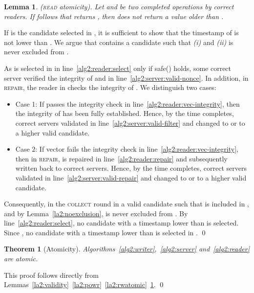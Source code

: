 \documentclass[10pt,conference,compsocconf]{IEEEtran}
\newtheorem{la}[defn]{Lemma}
\newtheorem{theo}[defn]{Theorem}
\newenvironment{prooff}{\vspace{1ex}\noindent{\bf Proof:}\hspace{0.5em}}
	{\hfill\qed\vspace{1em}}
\begin{document}
\begin{la}
\label{la2:rratomic}
\emph{(\textsc{read} atomicity).}
Let  and  be two completed  operations by correct readers. If  follows  that returns , then  does not return a value older than .
\end{la}
\begin{prooff} If  is the candidate selected in , it is sufficient to show that the timestamp of  is not lower than . We argue that
 contains a candidate  such that \textit{(i)}  and \textit{(ii)}  is never excluded from .

As  is selected in  in line~\ref{alg2:reader:select} only if \textsf{safe}() holds, some correct server verified the integrity of  and  in line~\ref{alg2:server:valid-nonce}. In addition, in \textsc{repair}, the reader in  checks the integrity of . We distinguish two cases:
\begin{itemize}
\item Case 1: If  passes the integrity check in line~\ref{alg2:reader:vec-integrity}, then the integrity of  has been fully established. Hence, by the time  completes,  correct servers validated  in line~\ref{alg2:server:valid-filter} and changed  to  or to a higher valid candidate.
\item Case 2: If vector  fails the integrity check in line~\ref{alg2:reader:vec-integrity}, then in \textsc{repair},  is repaired in line~\ref{alg2:reader:repair} and subsequently written back to  correct servers. Hence, by the time  completes,  correct servers validated  in line~\ref{alg2:server:valid-repair} and changed  to  or to a higher valid candidate.
\end{itemize}
Consequently, in the \textsc{collect} round in  a valid candidate  such that  is included in , and by Lemma~\ref{la2:noexclusion},  is never excluded from . By line~\ref{alg2:reader:select}, no candidate with a timestamp lower than  is selected. Since , no candidate with a timestamp lower than  is selected in .
\end{prooff}

\begin{theo}[Atomicity]
Algorithms~\ref{alg2:writer},~\ref{alg2:server} and~\ref{alg2:reader} are atomic.
\end{theo}
\begin{prooff} This proof follows directly from Lemmas~\ref{la2:validity}~\ref{la2:powr}~\ref{la2:rwatomic}~\ref{la2:rratomic}.
\end{prooff}
\end{document}
